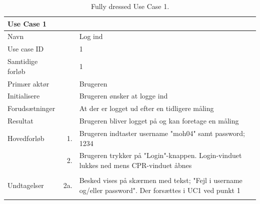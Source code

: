 \begin{longtabu} to  %
    {\large \textbf{Use Case 1}} && \\
    \toprule
    Navn &&    Log ind\\
    Use case ID &&    1\\
    Samtidige forløb &&    1\\
    Primær aktør &&    Brugeren\\
    Initialisere &&    Brugeren ønsker at logge ind\\
    Forudsætninger &&  At der er logget ud efter en tidligere måling\\
    Resultat &&    Brugeren bliver logget på og kan foretage en måling                     \\ \midrule
    Hovedforløb &    1. &    Brugeren indtaster username "moh04" samt password; 1234\\[-1ex]   						 	
                &    2. &    Brugeren trykker på "Login"-knappen. Login-vinduet lukkes ned mens CPR-vinduet åbnes\\[-1ex]
                &    \\ \midrule
                
    Undtagelser &    2a. & Besked vises på skærmen med tekst; "Fejl i username og/eller password". Der forsættes i UC1 ved punkt 1     \\ \bottomrule
\caption{Fully dressed Use Case 1.}
\label{UC1}
\end{longtabu}

